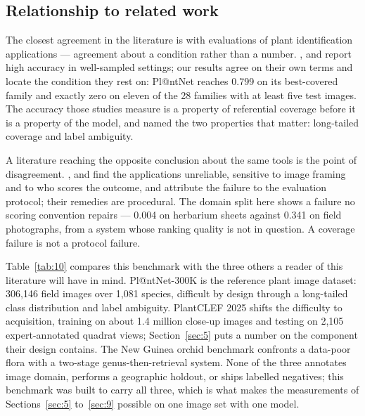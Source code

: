 \documentclass[preprint,12pt,authoryear]{elsarticle}
\begin{document}
\setcounter{section}{10}

\setcounter{subsection}{3}

\subsection{Relationship to related work}\label{sec:10.4}

The closest agreement in the literature is with evaluations of plant identification applications --- agreement about a condition rather than a number. \citet{partel2021}, \citet{rzanny2024} and \citet{mader2021} report high accuracy in well-sampled settings; our results agree on their own terms and locate the condition they rest on: Pl@ntNet reaches 0.799 on its best-covered family and exactly zero on eleven of the 28 families with at least five test images. The accuracy those studies measure is a property of referential coverage before it is a property of the model, and \citet{garcin2021} named the two properties that matter: long-tailed coverage and label ambiguity.

A literature reaching the opposite conclusion about the same tools is the point of disagreement. \citet{campbell2023}, \citet{hart2023} and \citet{long2023} find the applications unreliable, sensitive to image framing and to who scores the outcome, and attribute the failure to the evaluation protocol; their remedies are procedural. The domain split here shows a failure no scoring convention repairs --- 0.004 on herbarium sheets against 0.341 on field photographs, from a system whose ranking quality is not in question. A coverage failure is not a protocol failure.

Table~\ref{tab:10} compares this benchmark with the three others a reader of this literature will have in mind. Pl@ntNet-300K \citep{garcin2021} is the reference plant image dataset: 306,146 field images over 1,081 species, difficult by design through a long-tailed class distribution and label ambiguity. PlantCLEF 2025 \citep{martellucci2025} shifts the difficulty to acquisition, training on about 1.4 million close-up images and testing on 2,105 expert-annotated quadrat views; Section~\ref{sec:5} puts a number on the component their design contains. The New Guinea orchid benchmark \citep{saputra2026} confronts a data-poor flora with a two-stage genus-then-retrieval system. None of the three annotates image domain, performs a geographic holdout, or ships labelled negatives; this benchmark was built to carry all three, which is what makes the measurements of Sections~\ref{sec:5} to~\ref{sec:9} possible on one image set with one model.
\end{document}
